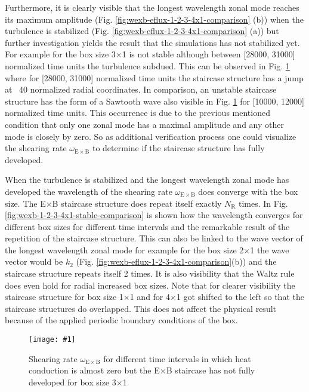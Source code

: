 \documentclass[aip, amsmath, amssymb, reprint, twocolumn]{revtex4-1}
\newcommand{\includegraphicsOneCol}[3]{
	\begin{figure}[ht]
		\texttt{[image: \#1]}
		\caption{#2}
		\label{#3}
  	\end{figure}
  	\increasecounter{fig}{1}
}
\begin{document}
Furthermore, it is clearly visible that the longest wavelength zonal mode reaches its maximum amplitude (Fig. \ref{fig:wexb-eflux-1-2-3-4x1-comparison} (b)) when the turbulence is stabilized  (Fig. \ref{fig:wexb-eflux-1-2-3-4x1-comparison} (a)) but further investigation yields the result that the simulations has not stabilized yet. For example for the box size 3$\times$1 is not stable although between [28000, 31000] normalized time units the turbulence subdued. This can be observed in Fig. \ref{fig:wexb-3x1-selection} where for [28000, 31000] normalized time units the staircase structure has a jump at ~40 normalized radial coordinates. In comparison, an unstable staircase structure has the form of a Sawtooth wave also visible in Fig. \ref{fig:wexb-3x1-selection} for [10000, 12000] normalized time units. This occurrence is due to the previous mentioned condition that only one zonal mode has a maximal amplitude and any other mode is closely by zero. So as additional verification process one could visualize the shearing rate $\omega_{\mathrm{E \times B}}$ to determine if the staircase structure has fully developed. 

When the turbulence is stabilized and the longest wavelength zonal mode has developed the wavelength of the shearing rate $\omega_{\mathrm{E \times B}}$ does converge with the box size. The E$\times$B staircase structure does repeat itself exactly $N_\mathrm{R}$ times. In Fig. \ref{fig:wexb-1-2-3-4x1-stable-comparison} is shown how the wavelength converges for different box sizes for different time intervals and the remarkable result of the repetition of the staircase structure. This can also be linked to the wave vector of the longest wavelength zonal mode for example for the box size 2$\times$1 the wave vector would be $k_2$ (Fig. \ref{fig:wexb-eflux-1-2-3-4x1-comparison}(b)) and the staircase structure repeats itself 2 times. It is also visibility that the Waltz rule does even hold for radial increased box sizes. Note that for clearer visibility the staircase structure for box size 1$\times$1 and for 4$\times$1 got shifted to the left so that the staircase structures do overlapped. This does not affect the physical result because of the applied periodic boundary conditions of the box. 

\includegraphicsOneCol{S6_rlt6.0/boxsize3x1/Ns16/Nvpar48/Nmu9/S6_rlt6.0_boxsize3x1_Ns16_Nvpar48_Nmu9_wexb_selection.pdf}{
	Shearing rate $\omega_{\mathrm{E \times B}}$ for different time intervals in which heat conduction is almost zero but the E$\times$B staircase has not fully developed for box size 3$\times$1
}{fig:wexb-3x1-selection}
\end{document}
